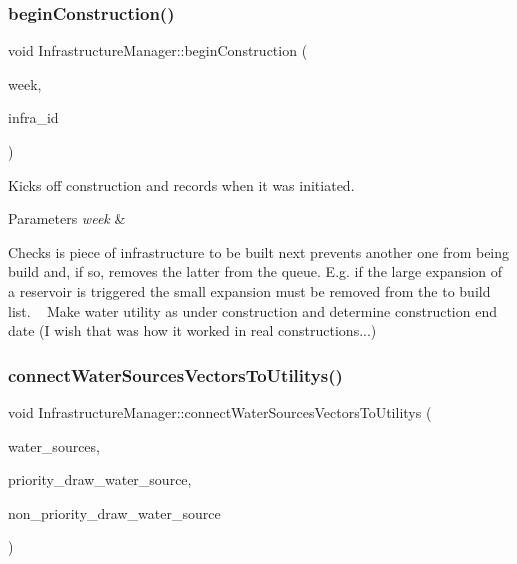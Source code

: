 \subsubsection{\texorpdfstring{begin\+Construction()}{beginConstruction()}}
{\footnotesize\ttfamily void Infrastructure\+Manager\+::begin\+Construction (\begin{DoxyParamCaption}\item[{int}]{week,  }\item[{int}]{infra\+\_\+id }\end{DoxyParamCaption})}

Kicks off construction and records when it was initiated. 
\begin{DoxyParams}{Parameters}
{\em week} & \\
\hline
\end{DoxyParams}
Checks is piece of infrastructure to be built next prevents another one from being build and, if so, removes the latter from the queue. E.\+g. if the large expansion of a reservoir is triggered the small expansion must be removed from the to build list. ~\newline
 Make water utility as under construction and determine construction end date (I wish that was how it worked in real constructions...) \mbox{\label{classInfrastructureManager_a8ff698443fd4f32e28677aa9ef34c2dc_a8ff698443fd4f32e28677aa9ef34c2dc}} 
\subsubsection{\texorpdfstring{connect\+Water\+Sources\+Vectors\+To\+Utilitys()}{connectWaterSourcesVectorsToUtilitys()}}
{\footnotesize\ttfamily void Infrastructure\+Manager\+::connect\+Water\+Sources\+Vectors\+To\+Utilitys (\begin{DoxyParamCaption}\item[{vector$<$ \mbox{\hyperlink{classWaterSource}{Water\+Source}} $\ast$$>$ \&}]{water\+\_\+sources,  }\item[{vector$<$ int $>$ \&}]{priority\+\_\+draw\+\_\+water\+\_\+source,  }\item[{vector$<$ int $>$ \&}]{non\+\_\+priority\+\_\+draw\+\_\+water\+\_\+source }\end{DoxyParamCaption})}

